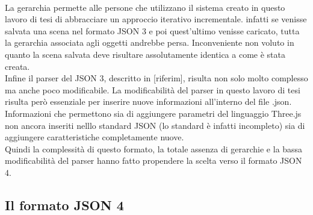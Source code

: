 \\
La gerarchia permette alle persone che utilizzano il sistema creato in questo lavoro di tesi di abbracciare un approccio iterativo incrementale. infatti se venisse salvata una scena nel formato JSON 3 e poi quest’ultimo venisse caricato, tutta la gerarchia associata agli oggetti andrebbe persa. Inconveniente non voluto in quanto la scena salvata deve risultare assolutamente identica a come è stata creata.
\\
Infine il parser del JSON 3, descritto in [riferim], risulta non solo molto complesso ma anche poco modificabile. La modificabilità del parser in questo lavoro di tesi risulta però essenziale per inserire nuove informazioni all’interno del file .json. Informazioni che permettono sia di aggiungere parametri del linguaggio Three.js non ancora inseriti nelllo standard JSON (lo standard è infatti incompleto) sia di aggiungere caratteristiche completamente nuove.
\\
Quindi la complessità di questo formato, la totale assenza di gerarchie e la bassa modificabilità del parser hanno fatto propendere la scelta verso il formato JSON 4.

\subsection{Il formato JSON 4}
\label{sec:formato_scambio_formato_json4}

